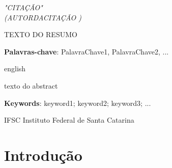 \documentclass[oneside,12pt]{abntex2}
\begin{document}

\begin{epigrafe}
	\vspace*{\fill}
	\begin{flushright}
		\textit{"CITAÇÃO"\\
		(AUTORDACITAÇÃO )}
	\end{flushright}
\end{epigrafe}



\begin{resumo}

TEXTO DO RESUMO

\vspace{\onelineskip}
\noindent
\textbf{Palavras-chave}: PalavraChave1, PalavraChave2, ...
\end{resumo}



\begin{resumo}[Abstract]
	\begin{otherlanguage*}{english}
	
		texto do abstract
		
		\vspace{\onelineskip}
		\noindent
		\textbf{Keywords}: keyword1; keyword2; keyword3; ...
	\end{otherlanguage*}
\end{resumo}



\begin{siglas}

	\item[IFSC] Instituto Federal de Santa Catarina
	
\end{siglas}



\tableofcontents* %




\textual


\chapter{Introdução}
\end{document}
